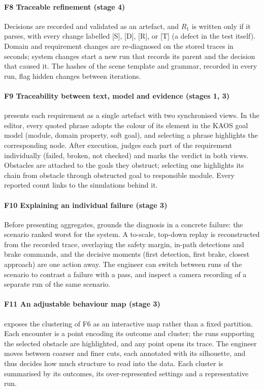 \paragraph*{F8 Traceable refinement (stage 4)} Decisions are recorded and
validated as an artefact, and $R_1$ is written only if it parses, with every
change labelled [S], [D], [R], or [T] (a defect in the test itself). Domain and
requirement changes are re-diagnosed on the stored traces in seconds; system
changes start a new run that records its parent and the decision that caused
it. The hashes of the scene template and grammar, recorded in every run, flag
hidden changes between
iterations.

\paragraph*{F9 Traceability between text, model and evidence (stages 1, 3)}
\tool{} presents each requirement as a single artefact with two synchronised
views. In the editor, every quoted phrase adopts the colour of its element in
the KAOS goal model (module, domain property, soft goal), and selecting a
phrase highlights the corresponding node. After execution, \tool{} judges each
part of the requirement individually (failed, broken, not checked) and marks
the verdict in both views. Obstacles are attached to the goals they obstruct;
selecting one highlights its chain from obstacle through obstructed goal to
responsible module. Every reported count links to the simulations behind it.

\paragraph*{F10 Explaining an individual failure (stage 3)} Before presenting
aggregates, \tool{} grounds the diagnosis in a concrete failure: the scenario
ranked worst for the system. A to-scale, top-down replay is reconstructed from
the recorded trace, overlaying the safety margin, in-path detections and brake
commands, and the decisive moments (first detection, first brake, closest
approach) are one action away. The engineer can switch between runs of the
scenario to contrast a failure with a pass, and inspect a camera recording of
a separate run of the same scenario.

\paragraph*{F11 An adjustable behaviour map (stage 3)} \tool{} exposes the
clustering of F6 as an interactive map rather than a fixed partition. Each
encounter is a point encoding its outcome and cluster; the runs supporting the
selected obstacle are highlighted, and any point opens its trace. The engineer
moves between coarser and finer cuts, each annotated with its silhouette, and
thus decides how much structure to read into the data. Each cluster is
summarised by its outcomes, its over-represented settings and a representative
run.

